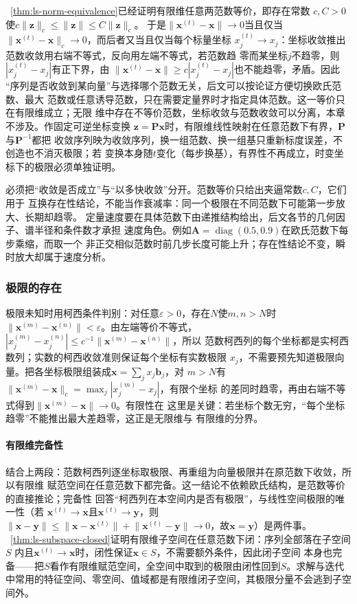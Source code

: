 ~\ref{thm:ls-norm-equivalence}已经证明有限维任意两范数等价，即存在常数
$c,C>0$使$c\lVert\bm z\rVert_c\leq\lVert\bm z\rVert\leq C\lVert\bm z\rVert_c$。
于是$\lVert\bm x^{(t)}-\bm x\rVert\to0$当且仅当
$\lVert\bm x^{(t)}-\bm x\rVert_c\to0$，而后者又当且仅当每个标量坐标
$x_j^{(t)}\to x_j$：坐标收敛推出范数收敛用右端不等式，反向用左端不等式，若范数趋
零而某坐标$j$不趋零，则$|x_j^{(t)}-x_j|$有正下界，由
$\lVert\bm x^{(t)}-\bm x\rVert\geq c|x_j^{(t)}-x_j|$也不能趋零，矛盾。因此
“序列是否收敛到某向量”与选择哪个范数无关，后文可以按论证方便切换欧氏范数、最大
范数或任意诱导范数，只在需要定量界时才指定具体范数。这一等价只在有限维成立；无限
维中存在不等价范数，坐标收敛与范数收敛可以分离，本章不涉及。作固定可逆坐标变换
$\bm z=\bm P\bm x$时，有限维线性映射在任意范数下有界，$\bm P$与$\bm P^{-1}$都把
收敛序列映为收敛序列，换一组范数、换一组基只重新标度误差，不创造也不消灭极限；若
变换本身随$t$变化（每步换基），有界性不再成立，时变坐标下的极限必须单独证明。

必须把“收敛是否成立”与“以多快收敛”分开。范数等价只给出夹逼常数$c,C$，它们用于
互换存在性结论，不能当作衰减率：同一个极限在不同范数下可能第一步放大、长期却趋零。
定量速度要在具体范数下由递推结构给出，后文各节的几何因子、谱半径和条件数才承担
速度角色。例如$\bm A=\operatorname{diag}(0.5,0.9)$在欧氏范数下每步乘缩，而取一个
非正交相似范数时前几步长度可能上升；存在性结论不变，瞬时放大却属于速度分析。

\subsubsection{极限的存在}

极限未知时用柯西条件判别：对任意$\varepsilon>0$，存在$N$使$m,n>N$时
$\lVert\bm x^{(m)}-\bm x^{(n)}\rVert<\varepsilon$。由左端等价不等式，
$|x_j^{(m)}-x_j^{(n)}|\leq c^{-1}\lVert\bm x^{(m)}-\bm x^{(n)}\rVert$，所以
范数柯西列的每个坐标都是实柯西数列；实数的柯西收敛准则保证每个坐标有实数极限
$x_j$，不需要预先知道极限向量。把各坐标极限组装成$\bm x=\sum_jx_j\bm b_j$，对
$m>N$有$\lVert\bm x^{(m)}-\bm x\rVert_c=\max_j|x_j^{(m)}-x_j|$，有限个坐标
的差同时趋零，再由右端不等式得到$\lVert\bm x^{(m)}-\bm x\rVert\to0$。有限性在
这里是关键：若坐标个数无穷，“每个坐标趋零”不能推出最大差趋零，这正是无限维与
有限维的分界。

\paragraph{有限维完备性}

结合上两段：范数柯西列逐坐标取极限、再重组为向量极限并在原范数下收敛，所以有限维
赋范空间在任意范数下都完备。这一结论不依赖欧氏结构，是范数等价的直接推论；完备性
回答“柯西列在本空间内是否有极限”，与线性空间极限的唯一性（若
$\bm x^{(t)}\to\bm x$且$\bm x^{(t)}\to\bm y$，则
$\lVert\bm x-\bm y\rVert\leq\lVert\bm x-\bm x^{(t)}\rVert+
\lVert\bm x^{(t)}-\bm y\rVert\to0$，故$\bm x=\bm y$）是两件事。
~\ref{thm:ls-subspace-closed}证明有限维子空间在任意范数下闭：序列全部落在子空间$S$
内且$\bm x^{(t)}\to\bm x$时，闭性保证$\bm x\in S$，不需要额外条件，因此闭子空间
本身也完备——把$S$看作有限维赋范空间，全空间中取到的极限由闭性回到$S$。求解与迭代
中常用的特征空间、零空间、值域都是有限维闭子空间，其极限分量不会逃到子空间外。

